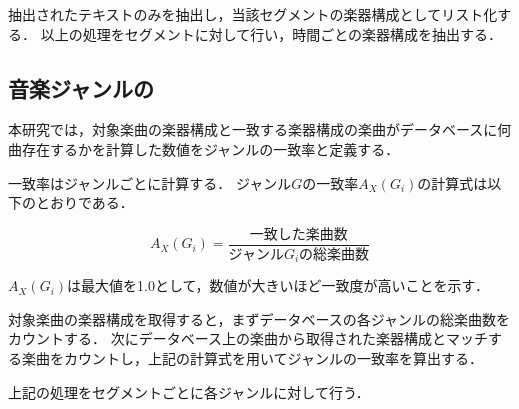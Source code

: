 

抽出されたテキストのみを抽出し，当該セグメントの楽器構成としてリスト化する．
以上の処理をセグメントに対して行い，時間ごとの楽器構成を抽出する．

\subsection{音楽ジャンルの}
本研究では，対象楽曲の楽器構成と一致する楽器構成の楽曲がデータベースに何曲存在するかを計算した数値をジャンルの一致率と定義する．

一致率はジャンルごとに計算する．
ジャンル$G$の一致率$A_X(G_i)$の計算式は以下のとおりである．

\begin{equation}
	A_X(G_i) = \frac{\text{一致した楽曲数}}{\text{ジャンル}G_i\text{の総楽曲数}}
\end{equation}

$A_X(G_i)$は最大値を1.0として，数値が大きいほど一致度が高いことを示す．

対象楽曲の楽器構成を取得すると，まずデータベースの各ジャンルの総楽曲数をカウントする．
次にデータベース上の楽曲から取得された楽器構成とマッチする楽曲をカウントし，上記の計算式を用いてジャンルの一致率を算出する．

上記の処理をセグメントごとに各ジャンルに対して行う．




